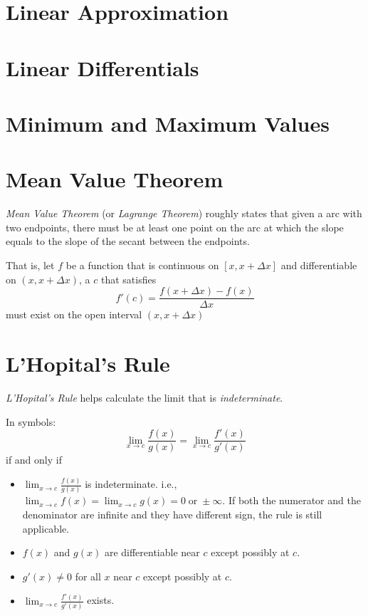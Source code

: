 \documentclass{note}
\begin{document}
\section{Linear Approximation}
\section{Linear Differentials}
\section{Minimum and Maximum Values}
\section{Mean Value Theorem}

\textit{Mean Value Theorem} (or \textit{Lagrange Theorem}) roughly states that given a arc with two endpoints, there must be at least one point on the arc at which the slope equals to the slope of the secant between the endpoints.

That is, let $f$ be a function that is continuous on $[x, x + \Delta x]$ and differentiable on $(x, x + \Delta x)$, a $c$ that satisfies
\begin{equation*}
  f'(c) = \frac{f(x + \Delta x) - f(x)}{\Delta x}
\end{equation*}
must exist on the open interval $(x, x + \Delta x)$

\section{L'Hopital's Rule}

\textit{L'Hopital's Rule} helps calculate the limit that is \textit{indeterminate}.

In symbols:
\[
  \lim_{x \to c} \frac{f(x)}{g(x)} = \lim_{x \to c} \frac{f'(x)}{g'(x)}
\]
if and only if
\begin{itemize}
  \item $\lim_{x \to c} \frac{f(x)}{g(x)}$ is indeterminate. i.e., $\lim_{x \to c} f(x) = \lim_{x \to c} g(x) = 0 \;\mathrm{or}\; \pm\infty$. If both the numerator and the denominator are infinite and they have different sign, the rule is still applicable.
  \item $f(x)$ and $g(x)$ are differentiable near $c$ except possibly at $c$.
  \item $g'(x) \neq 0$ for all $x$ near $c$ except possibly at $c$.
  \item $\lim_{x \to c} \frac{f'(x)}{g'(x)}$ exists.
\end{itemize}
\end{document}
